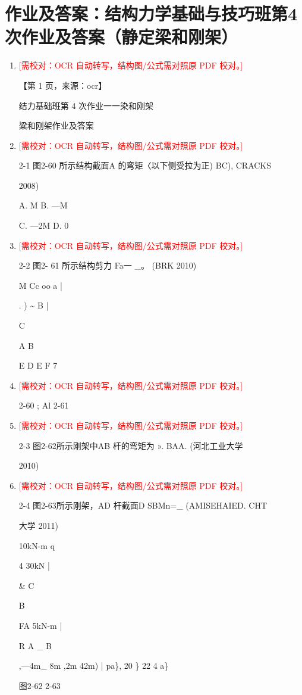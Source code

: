 \documentclass[UTF8,12pt,a4paper,openany]{ctexbook}
\newcommand{\TODO}[1]{\textcolor{red}{[需校对：#1]}}
\begin{document}
\section{作业及答案：结构力学基础与技巧班第4次作业及答案（静定梁和刚架）}
\begin{enumerate}[label=\textbf{\arabic*.},leftmargin=2em]
\item \TODO{OCR 自动转写，结构图/公式需对照原 PDF 校对。}\par 【第 1 页，来源：ocr】\par 结力基础班第 4 次作业一一染和刚架\par 粱和刚架作业及答案
\item \TODO{OCR 自动转写，结构图/公式需对照原 PDF 校对。}\par 2-1 图2-60 所示结构截面A 的弯矩〈以下侧受拉为正) BC), CRACKS\par 2008)\par A. M                       B. —M\par C. —2M                     D. 0
\item \TODO{OCR 自动转写，结构图/公式需对照原 PDF 校对。}\par 2-2 图2- 61 所示结构剪力 Fa一         \_。 (BRK 2010)\par M                            Cc  oo a |\par .     )  \textasciitilde{}    B                      |\par C\par A     B\par E        D                                     E       F                  7
\item \TODO{OCR 自动转写，结构图/公式需对照原 PDF 校对。}\par 2-60                            ;      Al 2-61
\item \TODO{OCR 自动转写，结构图/公式需对照原 PDF 校对。}\par 2-3 图2-62所示刚架中AB 杆的弯矩为  ». BAA.  (河北工业大学\par 2010)
\item \TODO{OCR 自动转写，结构图/公式需对照原 PDF 校对。}\par 2-4 图2-63所示刚架，AD 杆截面D SBMn=\_ (AMISEHAIED. CHT\par 大学 2011)\par 10kN-m                                     q\par 4              30kN    |\par \&                       C\par B\par FA            5kN-m                                                   |\par R                      A            \_            B\par ,—4m\_   8m    ,2m 42m)       |   pa\}, 20 \} 22 4 a\}\par 图2-62 2-63

\end{enumerate}
\end{document}
